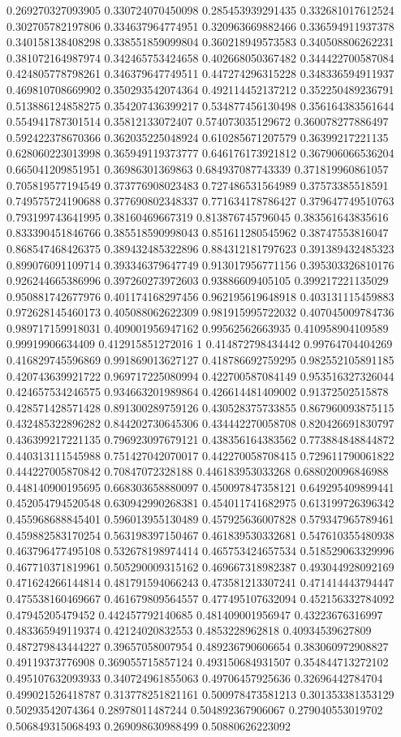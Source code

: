 \begin{table}
\begin{tabu}
\begin{sparkline}{10}
0.269270327093905 0.330724070450098 0.285453939291435 0.332681017612524 0.302705782197806 0.334637964774951 0.320963669882466 0.336594911937378 0.340158138408298 0.338551859099804 0.360218949573583 0.340508806262231 0.381072164987974 0.342465753424658 0.402668050367482 0.344422700587084 0.424805778798261 0.346379647749511 0.447274296315228 0.348336594911937 0.469810708669902 0.350293542074364 0.492114452137212 0.352250489236791 0.513886124858275 0.354207436399217 0.534877456130498 0.356164383561644 0.554941787301514 0.35812133072407 0.574073035129672 0.360078277886497 0.592422378670366 0.362035225048924 0.610285671207579 0.36399217221135 0.628060223013998 0.365949119373777 0.646176173921812 0.367906066536204 0.665041209851951 0.36986301369863 0.684937087743339 0.371819960861057 0.705819577194549 0.373776908023483 0.727486531564989 0.37573385518591 0.749575724190688 0.377690802348337 0.771634178786427 0.379647749510763 0.793199743641995 0.38160469667319 0.813876745796045 0.383561643835616 0.833390451846766 0.385518590998043 0.851611280545962 0.38747553816047 0.868547468426375 0.389432485322896 0.884312181797623 0.391389432485323 0.899076091109714 0.393346379647749 0.913017956771156 0.395303326810176 0.926244665386996 0.397260273972603 0.93886609405105 0.399217221135029 0.950881742677976 0.401174168297456 0.962195619648918 0.403131115459883 0.972628145460173 0.405088062622309 0.981915995722032 0.407045009784736 0.989717159918031 0.409001956947162 0.99562562663935 0.410958904109589 0.99919906634409 0.412915851272016 1 0.414872798434442 0.99764704404269 0.416829745596869 0.991869013627127 0.418786692759295 0.982552105891185 0.420743639921722 0.969717225080994 0.422700587084149 0.953516327326044 0.424657534246575 0.934663201989864 0.426614481409002 0.91372502515878 0.428571428571428 0.891300289759126 0.430528375733855 0.867960093875115 0.432485322896282 0.844202730645306 0.434442270058708 0.820426691830797 0.436399217221135 0.796923097679121 0.438356164383562 0.773884848844872 0.440313111545988 0.751427042070017 0.442270058708415 0.729611790061822 0.444227005870842 0.70847072328188 0.446183953033268 0.688020096846988 0.448140900195695 0.668303658880097 0.450097847358121 0.649295409899441 0.452054794520548 0.630942990268381 0.454011741682975 0.613199726396342 0.455968688845401 0.596013955130489 0.457925636007828 0.579347965789461 0.459882583170254 0.563198397150467 0.461839530332681 0.547610355480938 0.463796477495108 0.532678198974414 0.465753424657534 0.518529063329996 0.467710371819961 0.505290009315162 0.469667318982387 0.493044928092169 0.471624266144814 0.481791594066243 0.473581213307241 0.471414443794447 0.475538160469667 0.461679809564557 0.477495107632094 0.452156332784092 0.47945205479452 0.442457792140685 0.481409001956947 0.43223676316997 0.483365949119374 0.42124020832553 0.4853228962818 0.40934539627809 0.487279843444227 0.39657058007954 0.489236790606654 0.383060972908827 0.49119373776908 0.369055715857124 0.493150684931507 0.354844713272102 0.495107632093933 0.340724961855063 0.49706457925636 0.32696442784704 0.499021526418787 0.313778251821161 0.500978473581213 0.301353381353129 0.50293542074364 0.28978011487244 0.504892367906067 0.279040553019702 0.506849315068493 0.269098630988499 0.50880626223092 
\end{sparkline}
\end{tabu}
\end{table}
